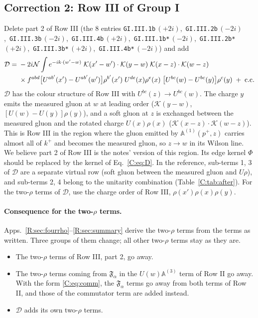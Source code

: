 \documentclass[10pt]{article}
\numberwithin{equation}{section}
\newcommand{\KK}{\mathcal K}
\newcommand{\NN}{\mathcal N}
\newcommand{\lab}[1]{\texttt{#1}}
\begin{document}
\subsection{Correction 2: Row III of Group I}
Delete part 2 of Row III (the 8 entries \lab{GI.III.1b}\,$(+2i)$,\ \lab{GI.III.2b}\,$(-2i)$,\ \lab{GI.III.3b}\,$(-2i)$,\ \lab{GI.III.4b}\,$(+2i)$,\ \lab{GI.III.1b*}\,$(-2i)$,\ \lab{GI.III.2b*}\,$(+2i)$,\ \lab{GI.III.3b*}\,$(+2i)$,\ \lab{GI.III.4b*}\,$(-2i)$) and add
\begin{align}
\mathcal D={}&-2i\NN\int e^{-ik\cdot(w'-w)}\;\KK(x'-w')\cdot\KK(y-w)\;\KK(x-z)\cdot\KK(w-z)\notag\\
&\times f^{abd}\big[U^{ab'}(x')-U^{ab'}(w')\big]\rho^{b'}(x')\;U^{de}(x)\rho^e(x)\;\big[U^{bc}(w)-U^{bc}(y)\big]\rho^c(y)\;+\;{\rm c.c.}
\label{C:eq:D}
\end{align}
$\mathcal D$ has the colour structure of Row III with $U^{bc}(z)\to U^{bc}(w)$. The charge $y$ emits the measured gluon at $w$ at leading order ($\KK(y-w)$, $[U(w)-U(y)]\rho(y)$), and a soft gluon at $z$ is exchanged between the measured gluon and the rotated charge $U(x)\rho(x)$ ($\KK(x-z)\cdot\KK(w-z)$). This is Row III in the region where the gluon emitted by $\mathbb A^{(1)}(p^+,z)$ carries almost all of $k^+$ and becomes the measured gluon, so $z\to w$ in its Wilson line. We believe part 2 of Row III is the notes' version of this region. Its edge kernel $\Phi$ should be replaced by the kernel of Eq.~\eqref{C:eq:D}. In the reference, sub-terms 1, 3 of $\mathcal D$ are a separate virtual row (soft gluon between the measured gluon and $U\rho$), and sub-terms 2, 4 belong to the unitarity combination (Table~\ref{C:tab:after}). For the two-$\rho$ terms of $\mathcal D$, use the charge order of Row III, $\rho(x')\rho(x)\rho(y)$.

\paragraph{Consequence for the two-$\rho$ terms.} Apps.~\ref{R:sec:fourrho}--\ref{R:sec:summary} derive the two-$\rho$ terms from the terms as written. Three groups of them change; all other two-$\rho$ terms stay as they are.
\begin{itemize}
\item The two-$\rho$ terms of Row III, part 2, go away.
\item The two-$\rho$ terms coming from $\mathfrak F_\alpha$ in the $U(w)\mathbb A^{(3)}$ term of Row II go away. With the form \eqref{C:eq:comm}, the $\mathfrak F_\alpha$ terms go away from both terms of Row II, and those of the commutator term are added instead.
\item $\mathcal D$ adds its own two-$\rho$ terms.
\end{itemize}
\end{document}

